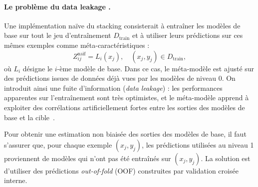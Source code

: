 \paragraph{Le problème du \og data leakage \fg{}.}
Une implémentation naïve du stacking consisterait à entraîner les modèles de base sur tout
le jeu d'entraînement $D_{\text{train}}$ et à utiliser leurs prédictions sur ces mêmes exemples
comme méta-caractéristiques :
\[
  Z_{ij}^{\text{na\"if}} = L_i(x_j),
  \quad (x_j,y_j) \in D_{\text{train}},
\]
où $L_i$ désigne le $i$-ème modèle de base. Dans ce cas, le méta-modèle est ajusté sur des
prédictions issues de données déjà vues par les modèles de niveau 0. On introduit ainsi une
fuite d'information (\emph{data leakage}) : les performances apparentes sur l'entraînement sont
très optimistes, et le méta-modèle apprend à exploiter des corrélations artificiellement fortes
entre les sorties des modèles de base et la cible~\cite{ting_witten_stacking_1999}.

Pour obtenir une estimation non biaisée des sorties des modèles de base, il faut s'assurer que,
pour chaque exemple $(x_j,y_j)$, les prédictions utilisées au niveau 1 proviennent de modèles
qui n'ont pas été entraînés sur $(x_j,y_j)$. La solution est d'utiliser des prédictions
\emph{out-of-fold} (OOF) construites par validation croisée interne.



